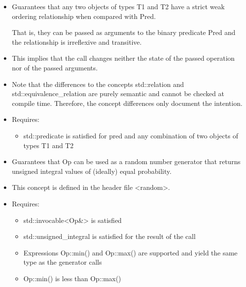 
\begin{itemize}
\item
Guarantees that any two objects of types T1 and T2 have a strict weak ordering relationship when compared with Pred.

That is, they can be passed as arguments to the binary predicate Pred and the relationship is irreflexive and transitive.

\item
This implies that the call changes neither the state of the passed operation nor of the passed arguments.

\item
Note that the differences to the concepts std::relation and std::equivalence\_relation are purely semantic and cannot be checked at compile time. Therefore, the concept differences only document the intention.

\item
Requires:
\begin{itemize}
\item
std::predicate is satisfied for pred and any combination of two objects of types T1 and T2
\end{itemize}
\end{itemize}


\begin{itemize}
\item
Guarantees that Op can be used as a random number generator that returns unsigned integral values of (ideally) equal probability.

\item
This concept is defined in the header file <random>.

\item
Requires:
\begin{itemize}
\item
std::invocable<Op\&> is satisfied

\item
std::unsigned\_integral is satisfied for the result of the call

\item
Expressions Op::min() and Op::max() are supported and yield the same type as the generator calls

\item
 Op::min() is less than Op::max()
\end{itemize}
\end{itemize}

